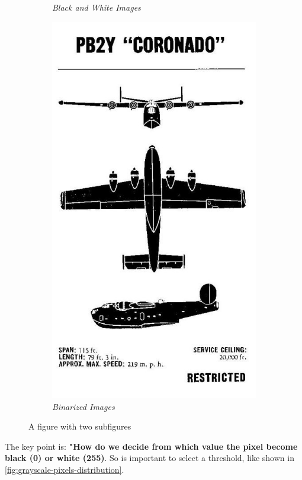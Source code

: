 \documentclass[paper=a4, fontsize=10pt]{scrartcl}	%
\begin{document}
\begin{figure}[H]
\begin{subfigure}{.5\textwidth}
			\caption{\textit{Black and White Images}}
			\label{fig:black-white}
		\end{subfigure}
		\begin{subfigure}{.5\textwidth}
			\centering
			\includegraphics[width=0.8\linewidth]{images/binarization/binarized.jpeg}
			\caption{\textit{Binarized Images}}
			\label{fig:binarized}
		\end{subfigure}
		\caption{A figure with two subfigures}
		\label{fig:test}
	\end{figure}

	The key point is: \textbf{"How do we decide from which value the pixel become black (0) or white (255)}. So is important to select a threshold, like shown in \autoref{fig:grayscale-pixels-distribution}.
\end{document}
